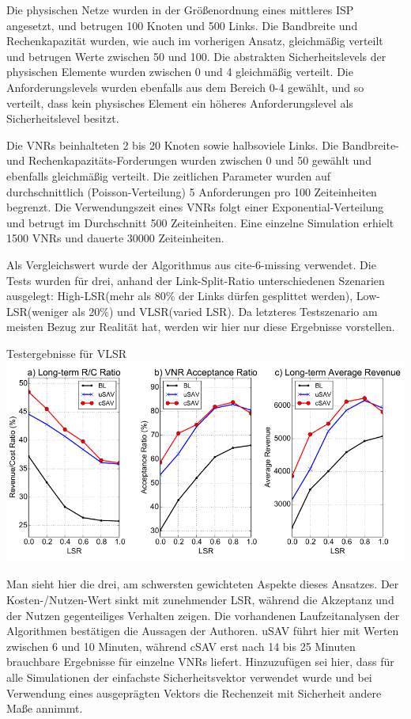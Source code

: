 \documentclass{lni}
\begin{document}
Die physischen Netze wurden in der Größenordnung eines mittleres ISP angesetzt, und betrugen 100 Knoten und 500 Links. Die Bandbreite und Rechenkapazität wurden, wie auch im vorherigen Ansatz, gleichmäßig verteilt und betrugen Werte zwischen 50 und 100. Die abstrakten Sicherheitslevels der physischen Elemente wurden zwischen 0 und 4 gleichmäßig verteilt. Die Anforderungslevels wurden ebenfalls aus dem Bereich 0-4 gewählt, und so verteilt, dass kein physisches Element ein höheres Anforderungslevel als Sicherheitslevel besitzt.

Die VNRs beinhalteten 2 bis 20 Knoten sowie halbsoviele Links. Die Bandbreite- und Rechenkapazitäts-Forderungen wurden zwischen 0 und 50 gewählt und ebenfalls gleichmäßig verteilt.
Die zeitlichen Parameter wurden auf durchschnittlich (Poisson-Verteilung) 5 Anforderungen pro 100 Zeiteinheiten begrenzt. Die Verwendungszeit eines VNRs folgt einer Exponential-Verteilung und betrugt im Durchschnitt 500 Zeiteinheiten. Eine einzelne Simulation erhielt 1500 VNRs und dauerte 30000 Zeiteinheiten. 

Als Vergleichswert wurde der Algorithmus aus cite-6-missing verwendet. Die Tests wurden für drei, anhand der Link-Split-Ratio unterschiedenen Szenarien ausgelegt: 
High-LSR(mehr als 80\% der Links dürfen gesplittet werden),
Low-LSR(weniger als 20\%) und VLSR(varied LSR). Da letzteres Testszenario am meisten Bezug zur Realität hat, werden wir hier nur diese Ergebnisse vorstellen. 

\begin{center}
Testergebnisse für VLSR
	\includegraphics[width=1\textwidth]{perf_algo2.pdf}\newline
\end{center}

Man sieht hier die drei, am schwersten gewichteten Aspekte dieses Ansatzes. Der Kosten-/Nutzen-Wert sinkt mit zunehmender LSR, während die Akzeptanz und der Nutzen gegenteiliges Verhalten zeigen. Die vorhandenen Laufzeitanalysen der Algorithmen bestätigen die Aussagen der Authoren. uSAV führt hier mit Werten zwischen 6 und 10 Minuten, während cSAV erst nach 14 bis 25 Minuten brauchbare Ergebnisse für einzelne VNRs liefert. Hinzuzufügen sei hier, dass für alle Simulationen der einfachste Sicherheitsvektor verwendet wurde und bei Verwendung eines ausgeprägten Vektors die Rechenzeit mit Sicherheit andere Maße annimmt.
\end{document}

